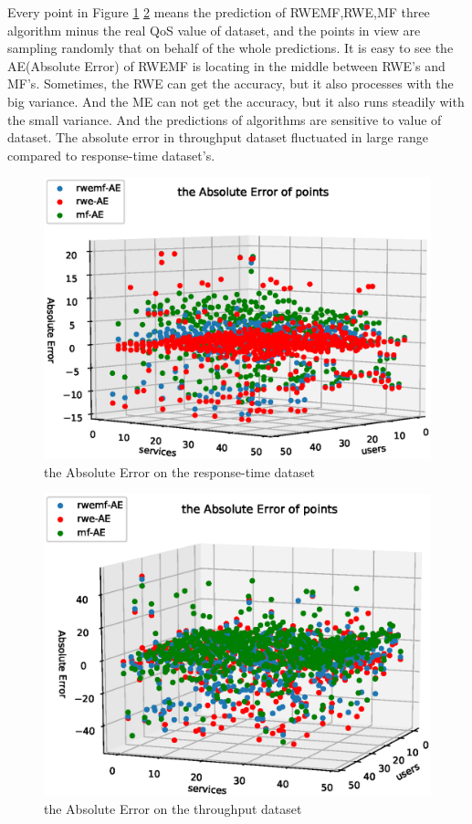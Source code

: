 \documentclass[conference]{IEEEtran}
\begin{document}
\par Every point in Figure \ref{fig_ae_rt} \ref{fig_ae_tp} means the prediction of RWEMF,RWE,MF three algorithm minus the real QoS value of dataset, and the points in view are sampling randomly that on behalf of the whole predictions. It is easy to see the AE(Absolute Error) of RWEMF is locating in the middle between RWE's and MF's. Sometimes, the RWE can get the accuracy, but it also processes with the big variance. And the ME can not get the accuracy, but it also runs steadily with the small variance. And the predictions of algorithms are sensitive to value of dataset. The absolute error in throughput dataset fluctuated in large range compared to response-time dataset's.

\begin{figure}[H] 
\centering  
\includegraphics[width=0.45\paperwidth]{ae_rt.eps}  
\caption{the Absolute Error on the response-time dataset }  
\label{fig_ae_rt}  
\end{figure} 

\begin{figure}[H] 
\centering  
\includegraphics[width=0.45\paperwidth]{ae_tp.eps}  
\caption{the Absolute Error on the throughput dataset }  
\label{fig_ae_tp}  
\end{figure} 
\end{document}

